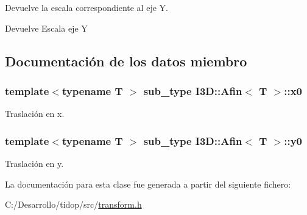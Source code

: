 Devuelve la escala correspondiente al eje Y. 

\begin{DoxyReturn}{Devuelve}
Escala eje Y 
\end{DoxyReturn}


\subsection{Documentación de los datos miembro}
\subsubsection[{\texorpdfstring{x0}{x0}}]{\setlength{\rightskip}{0pt plus 5cm}template$<$typename T $>$ {\bf sub\+\_\+type} {\bf I3\+D\+::\+Afin}$<$ T $>$\+::x0}\hypertarget{class_i3_d_1_1_afin_aff62b2c4443c19c78940f4113e67183b}{}\label{class_i3_d_1_1_afin_aff62b2c4443c19c78940f4113e67183b}


Traslación en x. 

\subsubsection[{\texorpdfstring{y0}{y0}}]{\setlength{\rightskip}{0pt plus 5cm}template$<$typename T $>$ {\bf sub\+\_\+type} {\bf I3\+D\+::\+Afin}$<$ T $>$\+::y0}\hypertarget{class_i3_d_1_1_afin_ac687b5efb2b75262c7aeeb31a2792c34}{}\label{class_i3_d_1_1_afin_ac687b5efb2b75262c7aeeb31a2792c34}


Traslación en y. 



La documentación para esta clase fue generada a partir del siguiente fichero\+:\begin{DoxyCompactItemize}
\item 
C\+:/\+Desarrollo/tidop/src/\hyperlink{transform_8h}{transform.\+h}\end{DoxyCompactItemize}
